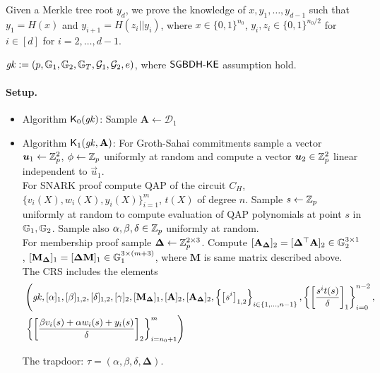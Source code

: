 Given a Merkle tree root $y_d$, we prove the knowledge of $x, y_1,\dots, y_{d-1}$ such that $y_1=H(x)$ and $y_{i+1}=H(z_i||y_i)$, where $x \in \{0,1\}^{n_0}$,  $y_i,z_i \in \{0,1\}^{n_0/2}$ for $i\in [d]$ for $i=2,\dots,d-1$.

$\mathit{gk}  := (p,\mathbb{G}_1,\mathbb{G}_2,\mathbb{G}_T,\mathcal{G}_1,\mathcal{G}_2,e)$, where $\mathsf{SGBDH\mbox{-}KE}$ assumption hold.

\paragraph{Setup.} \begin{itemize}
	\item Algorithm $\mathsf{K}_0(\mathit{gk})$: Sample $\mathbf{A} \gets \mathcal{D}_1$ \\
	\item Algorithm $\mathsf{K}_1(\mathit{gk},\mathbf{A} )$: For Groth-Sahai commitments sample a vector $\vec{u}_1 \gets \Z_p^2$, $\phi\gets \mathbb{Z}_p$ uniformly at random and compute a vector $\vec{u}_2\in \Z_p^2$ linear independent to $\vec{u}_1$.\\
	For SNARK proof compute QAP of the circuit $C_H$, $\{v_i(X), w_i(X), y_i(X)\}_{i=1}^m$, $t(X)$ of degree $n$. Sample $s \gets \mathbb{Z}_p$ uniformly at random to compute evaluation of QAP polynomials at point $s$ in $\mathbb{G}_1, \mathbb{G}_2$. Sample also $\alpha, \beta,  \delta \in \mathbb{Z}_p$ uniformly at random.\\
	For membership proof sample
	$\mathbf{\Delta}\gets \mathbb{Z}_p^{2\times 3}$. Compute $[\mathbf{A}_{\mathbf{\Delta}}]_2=[\mathbf{\Delta}^{\top}\mathbf{A}]_2 \in \mathbb{G}_2^{3\times 1}$, $[\mathbf{M}_{\mathbf{\Delta}}]_1=[\mathbf{\Delta}\mathbf{M}]_1 \in \mathbb{G}_1^{3\times (m+3)}$, 
	where $\mathbf{M}$ is same matrix described above.\\
	The CRS includes the elements 	
	\[\begin{split}
	&\left(\mathit{gk},[\alpha]_{1},[\beta]_{1,2},[\delta]_{1,2},[\gamma]_2,[\mathbf{M}_{\mathbf{\Delta}}]_1,[\mathbf{A}]_2,[\mathbf{A}_{\mathbf{\Delta}}]_2,\left\{\left[s^{i}\right]_{1,2}\right\}_{i\in\{1,\dots,n-1\}},\left\{\left[\frac{s^i t(s)}{\delta}\right]_1\right\}_{i=0}^{n-2},\right.\\
	&\left.
	\left\{\left[\frac{\beta v_i(s)+\alpha w_i(s) +y_i(s)}{\delta}\right]_2\right\}_{i=n_0+1}^{m}\right)
	\end{split}\]
	
	The trapdoor: $\tau = (%
	\alpha, \beta,\delta, \mathbf{\Delta})$.
\end{itemize} 


